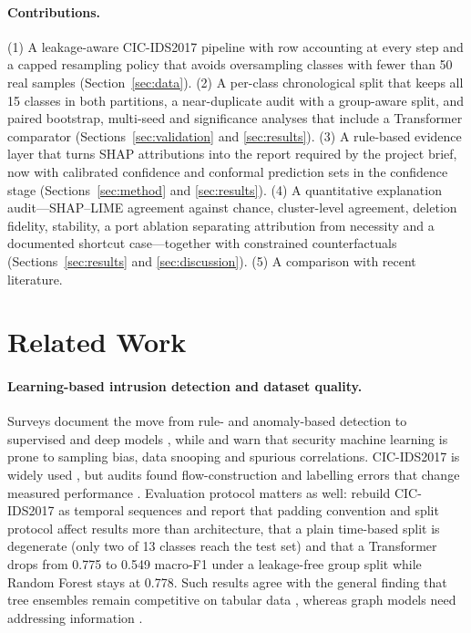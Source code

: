 \documentclass[11pt,a4paper]{article}
\begin{document}
\paragraph{Contributions.} (1) A leakage-aware CIC-IDS2017 pipeline with row accounting at every step and a capped resampling policy that avoids oversampling classes with fewer than 50 real samples (Section~\ref{sec:data}). (2) A per-class chronological split that keeps all 15 classes in both partitions, a near-duplicate audit with a group-aware split, and paired bootstrap, multi-seed and significance analyses that include a Transformer comparator (Sections~\ref{sec:validation} and \ref{sec:results}). (3) A rule-based evidence layer that turns SHAP attributions into the report required by the project brief, now with calibrated confidence and conformal prediction sets in the confidence stage (Sections~\ref{sec:method} and \ref{sec:results}). (4) A quantitative explanation audit---SHAP--LIME agreement against chance, cluster-level agreement, deletion fidelity, stability, a port ablation separating attribution from necessity and a documented shortcut case---together with constrained counterfactuals (Sections~\ref{sec:results} and \ref{sec:discussion}). (5) A comparison with recent literature.

\section{Related Work}
\label{sec:related}

\paragraph{Learning-based intrusion detection and dataset quality.} Surveys document the move from rule- and anomaly-based detection to supervised and deep models \parencite{buczak2016,vinayakumar2019}, while \textcite{sommer2010} and \textcite{arp2022} warn that security machine learning is prone to sampling bias, data snooping and spurious correlations. CIC-IDS2017 \parencite{sharafaldin2018} is widely used \parencite{panigrahi2018,maseer2021,ring2019}, but audits found flow-construction and labelling errors that change measured performance \parencite{engelen2021,lanvin2023}. Evaluation protocol matters as well: \textcite{moczkodan2026} rebuild CIC-IDS2017 as temporal sequences and report that padding convention and split protocol affect results more than architecture, that a plain time-based split is degenerate (only two of 13 classes reach the test set) and that a Transformer drops from 0.775 to 0.549 macro-F1 under a leakage-free group split while Random Forest stays at 0.778. Such results agree with the general finding that tree ensembles remain competitive on tabular data \parencite{grinsztajn2022,shwartzziv2022}, whereas graph models need addressing information \parencite{kipf2017,hamilton2017,lo2022}.
\end{document}
